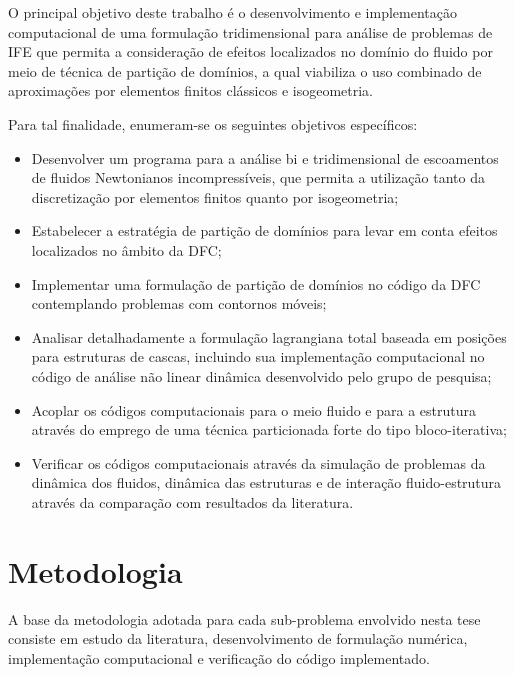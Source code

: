 O principal objetivo deste trabalho é o desenvolvimento e implementação computacional de uma formulação tridimensional para análise de problemas de IFE que permita a consideração de efeitos localizados no domínio do fluido por meio de técnica de partição de domínios, a qual viabiliza o uso combinado de aproximações por elementos finitos clássicos e isogeometria.

Para tal finalidade, enumeram-se os seguintes objetivos específicos:

\begin{itemize}
	\item Desenvolver um programa para a análise bi e tridimensional de escoamentos de fluidos Newtonianos incompressíveis, que permita a utilização tanto da discretização por elementos finitos quanto por isogeometria;
	
	\item Estabelecer a estratégia de partição de domínios para levar em conta efeitos localizados no âmbito da DFC;

	\item Implementar uma formulação de partição de domínios no código da DFC contemplando problemas com contornos móveis;
	
	\item Analisar detalhadamente a formulação lagrangiana total baseada em posições para estruturas de cascas, incluindo sua implementação computacional no código de análise não linear dinâmica desenvolvido pelo grupo de pesquisa;
	
	\item Acoplar os códigos computacionais para o meio fluido e para a estrutura através do emprego de uma técnica particionada forte do tipo bloco-iterativa;
	
	\item Verificar os códigos computacionais através da simulação de problemas da dinâmica dos fluidos, dinâmica das estruturas e de interação fluido-estrutura através da comparação com resultados da literatura.
	
\end{itemize}

\section[Metodologia]{Metodologia} 
A base da metodologia adotada para cada sub-problema envolvido nesta tese consiste em estudo da literatura, desenvolvimento de formulação numérica, implementação computacional e verificação do código implementado.

